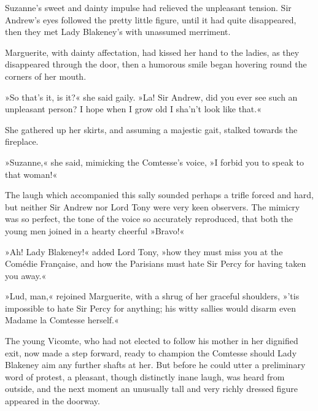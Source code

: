 Suzanne's sweet and dainty impulse had relieved the unpleasant tension. Sir Andrew's eyes followed the pretty little figure, until it had quite disappeared, then they met Lady Blakeney's with unassumed merriment.

Marguerite, with dainty affectation, had kissed her hand to the ladies, as they disappeared through the door, then a humorous smile began hovering round the corners of her mouth.

»So that's it, is it?« she said gaily. »La! Sir Andrew, did you ever see such an unpleasant person? I hope when I grow old I sha'n't look like that.«

She gathered up her skirts, and assuming a majestic gait, stalked towards the fireplace.

»Suzanne,« she said, mimicking the Comtesse's voice, »I forbid you to speak to that woman!«

The laugh which accompanied this sally sounded perhaps a trifle forced and hard, but neither Sir Andrew nor Lord Tony were very keen observers. The mimicry was so perfect, the tone of the voice so accurately reproduced, that both the young men joined in a hearty cheerful »Bravo!«

»Ah! Lady Blakeney!« added Lord Tony, »how they must miss you at the Comédie Française, and how the Parisians must hate Sir Percy for having taken you away.«

»Lud, man,« rejoined Marguerite, with a shrug of her graceful shoul\-ders, »'tis impossible to hate Sir Percy for anything; his witty sallies would disarm even Madame la Comtesse herself.«

The young Vicomte, who had not elected to follow his mother in her dignified exit, now made a step forward, ready to champion the Comtesse should Lady Blakeney aim any further shafts at her. But before he could utter a preliminary word of protest, a pleasant, though distinctly inane laugh, was heard from outside, and the next moment an unusually tall and very richly dressed figure appeared in the doorway.